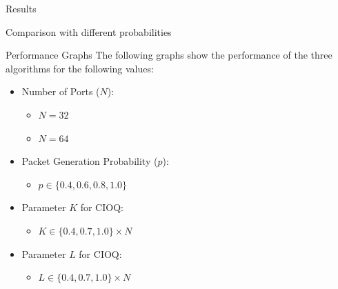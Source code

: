 \begin{section}{Results}
\begin{subsection}{Comparison with different probabilities}
\end{subsection}

\begin{subsection}{Performance Graphs}
    The following graphs show the performance of the three algorithms for the following values:
    \begin{multicols}{2}
        \begin{itemize}
            \item Number of Ports (\(N\)):
            \begin{itemize}
                \item \(N = 32\)
                \item \(N = 64\)
            \end{itemize}
            \item Packet Generation Probability (\(p\)):
            \begin{itemize}
                \item \(p \in \{0.4, 0.6, 0.8, 1.0\}\)
            \end{itemize}
        \end{itemize}

        \begin{itemize}
            \item Parameter \(K\) for CIOQ:
            \begin{itemize}
                \item \(K \in \{0.4, 0.7, 1.0\} \times N\)
            \end{itemize}
            \item Parameter \(L\) for CIOQ:
            \begin{itemize}
                \item \(L \in \{0.4, 0.7, 1.0\} \times N\)
            \end{itemize}
        \end{itemize}
    \end{multicols}


\end{subsection}
\end{section}
